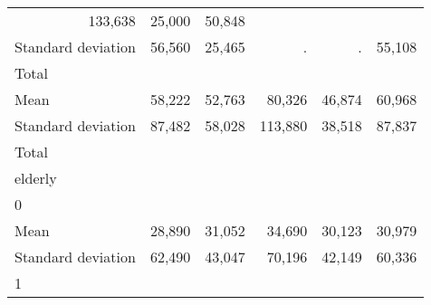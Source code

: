 \begin{tabular}{llllll}
  \multicolumn{1}{r}{133,638} &
  \multicolumn{1}{r}{25,000} &
  \multicolumn{1}{r}{50,848} \\
\multicolumn{1}{l}{\hspace{4em}Standard deviation} &
  \multicolumn{1}{|r}{56,560} &
  \multicolumn{1}{r}{25,465} &
  \multicolumn{1}{r}{.} &
  \multicolumn{1}{r}{.} &
  \multicolumn{1}{r}{55,108} \\
\multicolumn{1}{l}{\hspace{3em}Total} &
  \multicolumn{1}{|r}{} &
  \multicolumn{1}{r}{} &
  \multicolumn{1}{r}{} &
  \multicolumn{1}{r}{} &
  \multicolumn{1}{r}{} \\
\multicolumn{1}{l}{\hspace{4em}Mean} &
  \multicolumn{1}{|r}{58,222} &
  \multicolumn{1}{r}{52,763} &
  \multicolumn{1}{r}{80,326} &
  \multicolumn{1}{r}{46,874} &
  \multicolumn{1}{r}{60,968} \\
\multicolumn{1}{l}{\hspace{4em}Standard deviation} &
  \multicolumn{1}{|r}{87,482} &
  \multicolumn{1}{r}{58,028} &
  \multicolumn{1}{r}{113,880} &
  \multicolumn{1}{r}{38,518} &
  \multicolumn{1}{r}{87,837} \\
\multicolumn{1}{l}{\hspace{1em}Total} &
  \multicolumn{1}{|r}{} &
  \multicolumn{1}{r}{} &
  \multicolumn{1}{r}{} &
  \multicolumn{1}{r}{} &
  \multicolumn{1}{r}{} \\
\multicolumn{1}{l}{\hspace{2em}elderly} &
  \multicolumn{1}{|r}{} &
  \multicolumn{1}{r}{} &
  \multicolumn{1}{r}{} &
  \multicolumn{1}{r}{} &
  \multicolumn{1}{r}{} \\
\multicolumn{1}{l}{\hspace{3em}0} &
  \multicolumn{1}{|r}{} &
  \multicolumn{1}{r}{} &
  \multicolumn{1}{r}{} &
  \multicolumn{1}{r}{} &
  \multicolumn{1}{r}{} \\
\multicolumn{1}{l}{\hspace{4em}Mean} &
  \multicolumn{1}{|r}{28,890} &
  \multicolumn{1}{r}{31,052} &
  \multicolumn{1}{r}{34,690} &
  \multicolumn{1}{r}{30,123} &
  \multicolumn{1}{r}{30,979} \\
\multicolumn{1}{l}{\hspace{4em}Standard deviation} &
  \multicolumn{1}{|r}{62,490} &
  \multicolumn{1}{r}{43,047} &
  \multicolumn{1}{r}{70,196} &
  \multicolumn{1}{r}{42,149} &
  \multicolumn{1}{r}{60,336} \\
\multicolumn{1}{l}{\hspace{3em}1} &

\end{tabular}
